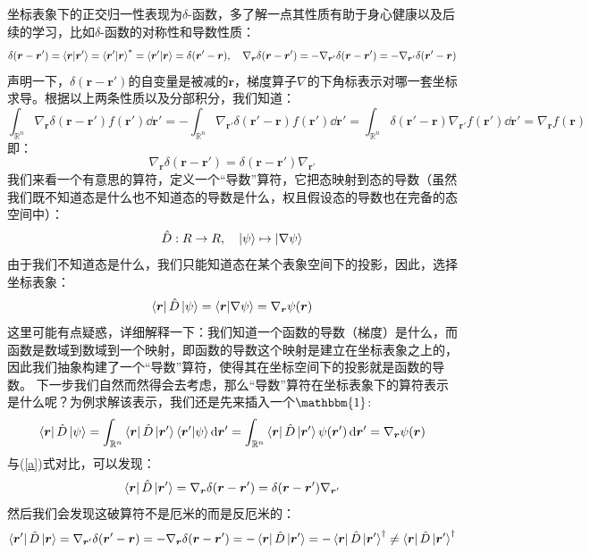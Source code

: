 坐标表象下的正交归一性表现为$\delta$-函数，多了解一点其性质有助于身心健康以及后续的学习，比如$\delta$-函数的对称性和导数性质：
\[\delta(\bm{r}-\bm{r}')=\bra{\bm{r}}\ket{\bm{r}'}=\bra{\bm{r}'}\ket{\bm{r}}^*=\bra{\bm{r}'}\ket{\bm{r}}=\delta(\bm{r}'-\bm{r}), \quad \nabla_{\bm{r}}\delta(\bm{r}-\bm{r}')=-\nabla_{\bm{r}'}\delta(\bm{r}-\bm{r}')=-\nabla_{\bm{r}'}\delta(\bm{r}'-\bm{r})\]
声明一下，$\delta(\bm{r}-\bm{r}')$的自变量是被减的$\bm{r}$，梯度算子$\nabla$的下角标表示对哪一套坐标求导。根据以上两条性质以及分部积分，我们知道：
\[\int_{\mathbb{R}^n}\nabla_{\bm{r}}\delta(\bm{r}-\bm{r}')f(\bm{r}')\dd{\bm{r}'}=-\int_{\mathbb{R}^n}\nabla_{\bm{r'}}\delta(\bm{r}'-\bm{r})f(\bm{r}')\dd{\bm{r}'}=\int_{\mathbb{R}^n}\delta(\bm{r}'-\bm{r})\nabla_{\bm{r'}}f(\bm{r}')\dd{\bm{r}'}=\nabla_{\bm{r}}f(\bm{r}) \tag{a}\label{a}\]
即：
\[\nabla_{\bm{r}}\delta(\bm{r}-\bm{r}')=\delta(\bm{r}-\bm{r}')\nabla_{\bm{r}'}\]
我们来看一个有意思的算符，定义一个“导数”算符，它把态映射到态的导数（虽然我们既不知道态是什么也不知道态的导数是什么，权且假设态的导数也在完备的态空间中）：
\[\hat{D}:R \to R, \quad \ket{\psi} \mapsto \ket{\nabla\psi} \]
由于我们不知道态是什么，我们只能知道态在某个表象空间下的投影，因此，选择坐标表象：
\[\bra{\bm{r}}\hat{D}\ket{\psi}=\bra{\bm{r}}\ket{\nabla\psi}=\nabla_{\bm{r}}\psi(\bm{r})\]
这里可能有点疑惑，详细解释一下：我们知道一个函数的导数（梯度）是什么，而函数是数域到数域到一个映射，即函数的导数这个映射是建立在坐标表象之上的，因此我们抽象构建了一个“导数”算符，使得其在坐标空间下的投影就是函数的导数。
下一步我们自然而然得会去考虑，那么“导数”算符在坐标表象下的算符表示是什么呢？为例求解该表示，我们还是先来插入一个$\mathbbm{1}$:
\[\bra{\bm{r}}\hat{D}\ket{\psi}=\int_{\mathbb{R}^n}\bra{\bm{r}}\hat{D}\ket{\bm{r}'}\bra{\bm{r}'}\ket{\psi}\dd{\bm{r}'}=\int_{\mathbb{R}^n}\bra{\bm{r}}\hat{D}\ket{\bm{r}'}\psi(\bm{r}')\dd{\bm{r}'}=\nabla_{\bm{r}}\psi(\bm{r})\]
与(\ref{a})式对比，可以发现：
\[\bra{\bm{r}}\hat{D}\ket{\bm{r}'}=\nabla_{\bm{r}}\delta(\bm{r}-\bm{r}')=\delta(\bm{r}-\bm{r}')\nabla_{\bm{r}'}\]
然后我们会发现这破算符不是厄米的而是反厄米的：
\[\bra{\bm{r}'}\hat{D}\ket{\bm{r}}=\nabla_{\bm{r}'}\delta(\bm{r}'-\bm{r})=-\nabla_{\bm{r}}\delta(\bm{r}-\bm{r}')=-\bra{\bm{r}}\hat{D}\ket{\bm{r}'}=-\bra{\bm{r}}\hat{D}\ket{\bm{r}'}^{\dagger}\neq\bra{\bm{r}}\hat{D}\ket{\bm{r}'}^{\dagger}\]

